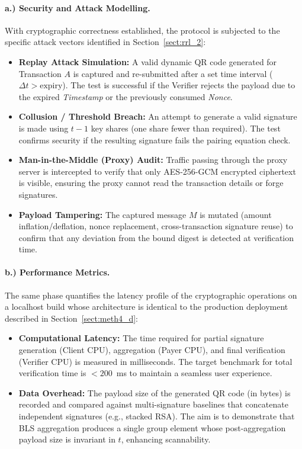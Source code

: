 \documentclass[a4paper]{scl-article}
\begin{document}
\paragraph{a.) Security and Attack Modelling.}
With cryptographic correctness established, the protocol is subjected to the specific attack vectors identified in Section~\ref{sect:rrl_2}:
\begin{itemize}
    \item \textbf{Replay Attack Simulation:} A valid dynamic QR code generated for Transaction $A$ is captured and re-submitted after a set time interval ($\Delta t > \text{expiry}$). The test is successful if the Verifier rejects the payload due to the expired \textit{Timestamp} or the previously consumed \textit{Nonce}.
    \item \textbf{Collusion / Threshold Breach:} An attempt to generate a valid signature is made using $t - 1$ key shares (one share fewer than required). The test confirms security if the resulting signature fails the pairing equation check.
    \item \textbf{Man-in-the-Middle (Proxy) Audit:} Traffic passing through the proxy server is intercepted to verify that only AES-256-GCM encrypted ciphertext is visible, ensuring the proxy cannot read the transaction details or forge signatures.
    \item \textbf{Payload Tampering:} The captured message $M$ is mutated (amount inflation/deflation, nonce replacement, cross-transaction signature reuse) to confirm that any deviation from the bound digest is detected at verification time.
\end{itemize}

\paragraph{b.) Performance Metrics.}
The same phase quantifies the latency profile of the cryptographic operations on a localhost build whose architecture is identical to the production deployment described in Section~\ref{sect:meth4_d}:
\begin{itemize}
    \item \textbf{Computational Latency:} The time required for partial signature generation (Client CPU), aggregation (Payer CPU), and final verification (Verifier CPU) is measured in milliseconds. The target benchmark for total verification time is $<200$~ms to maintain a seamless user experience.
    \item \textbf{Data Overhead:} The payload size of the generated QR code (in bytes) is recorded and compared against multi-signature baselines that concatenate independent signatures (e.g., stacked RSA). The aim is to demonstrate that BLS aggregation produces a single group element whose post-aggregation payload size is invariant in $t$, enhancing scannability.
\end{itemize}
\end{document}
